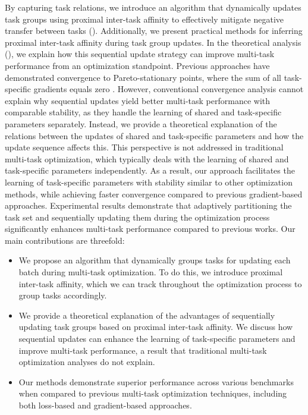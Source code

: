 By capturing task relations, we introduce an algorithm that dynamically updates task groups using proximal inter-task affinity to effectively mitigate negative transfer between tasks (). Additionally, we present practical methods for inferring proximal inter-task affinity during task group updates. In the theoretical analysis (), we explain how this sequential update strategy can improve multi-task performance from an optimization standpoint. Previous approaches have demonstrated convergence to Pareto-stationary points, where the sum of all task-specific gradients equals zero \citep{RN19, RN36, RN20, RN18, liu2021towards, navon2022multi, senushkin2023independent}. However, conventional convergence analysis cannot explain why sequential updates yield better multi-task performance with comparable stability, as they handle the learning of shared and task-specific parameters separately. Instead, we provide a theoretical explanation of the relations between the updates of shared and task-specific parameters and how the update sequence affects this. This perspective is not addressed in traditional multi-task optimization, which typically deals with the learning of shared and task-specific parameters independently. As a result, our approach facilitates the learning of task-specific parameters with stability similar to other optimization methods, while achieving faster convergence compared to previous gradient-based approaches. Experimental results demonstrate that adaptively partitioning the task set and sequentially updating them during the optimization process significantly enhances multi-task performance compared to previous works. Our main contributions are threefold:
\begin{itemize}[leftmargin=*]
\item We propose an algorithm that dynamically groups tasks for updating each batch during multi-task optimization. To do this, we introduce proximal inter-task affinity, which we can track throughout the optimization process to group tasks accordingly. 
\item  We provide a theoretical explanation of the advantages of sequentially updating task groups based on proximal inter-task affinity. We discuss how sequential updates can enhance the learning of task-specific parameters and improve multi-task performance, a result that traditional multi-task optimization analyses do not explain.
\item Our methods demonstrate superior performance across various benchmarks when compared to previous multi-task optimization techniques, including both loss-based and gradient-based approaches.
\end{itemize}
